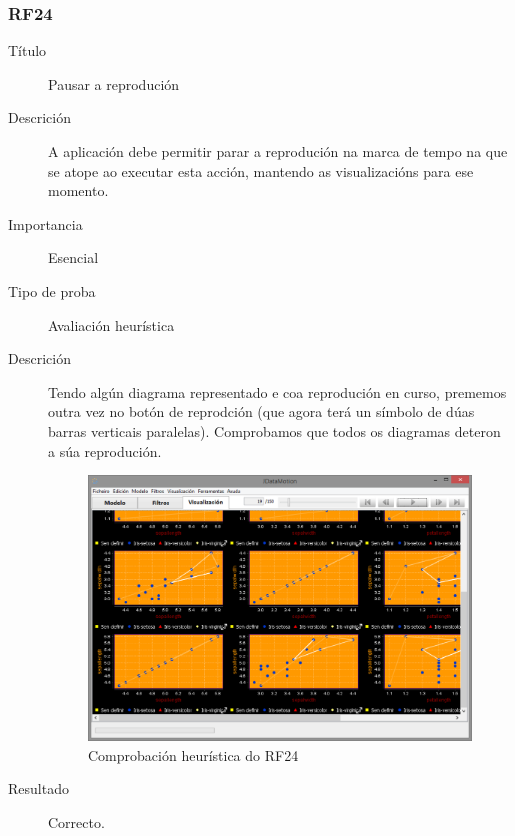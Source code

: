 \subsubsection*{RF24}
\begin{description}
\item[Título] \hfill
Pausar a reprodución
\item[Descrición] \hfill
A aplicación debe permitir parar a reprodución na marca de tempo na que se atope ao executar esta acción, mantendo as visualizacións para ese momento.
\item[Importancia] \hfill
Esencial
\item[Tipo de proba] \hfill
Avaliación heurística
\item[Descrición]
Tendo algún diagrama representado e coa reprodución en curso, prememos outra vez no botón de reprodción (que agora terá un símbolo de dúas barras verticais paralelas). Comprobamos que todos os diagramas deteron a súa reprodución.
\begin{figure}
\centering
\includegraphics[width=\textwidth,height=\textheight,keepaspectratio]{figuras/RF24}
\caption{Comprobación heurística do RF24}
\label{RF24}
\end{figure}
\item[Resultado]
Correcto.
\end{description}

